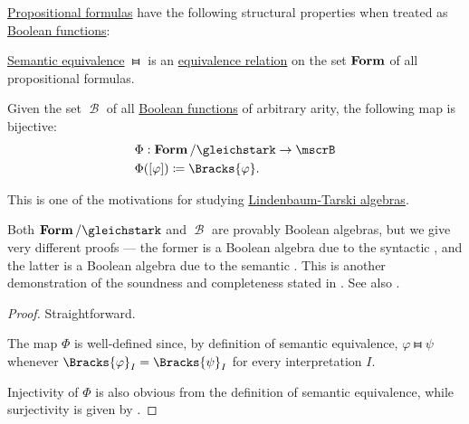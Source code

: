 \begin{proposition}\label{thm:propositional_formulas_and_boolean_functions}
  \hyperref[def:propositional_syntax/formula]{Propositional formulas} have the following structural properties when treated as \hyperref[def:boolean_function]{Boolean functions}:

  \begin{thmenum}
     \hyperref[def:propositional_entailment/equivalence]{Semantic equivalence} \( \gleichstark \) is an \hyperref[def:equivalence_relation]{equivalence relation} on the set \( \operatorname{\mathbf{Form}} \) of all propositional formulas.

     Given the set \( \mscrB \) of all \hyperref[def:boolean_function]{Boolean functions} of arbitrary arity, the following map is bijective:
    \begin{equation*}
      \begin{aligned}
        &\Phi: \boldop{Form} / {\gleichstark} \to \mscrB \\
        &\Phi([\varphi]) \coloneqq \Bracks{\varphi}.
      \end{aligned}
    \end{equation*}
  \end{thmenum}
\end{proposition}
\begin{comments}
  \item This is one of the motivations for studying \hyperref[def:lindenbaum_tarski_algebra]{Lindenbaum-Tarski algebras}.
  \item Both \( \boldop{Form} / {\gleichstark} \) and \( \mscrB \) are provably Boolean algebras, but we give very different proofs --- the former is a Boolean algebra due to the syntactic , and the latter is a Boolean algebra due to the semantic . This is another demonstration of the soundness and completeness stated in . See also .
\end{comments}
\begin{proof}
   Straightforward.

   The map \( \Phi \) is well-defined since, by definition of semantic equivalence, \( \varphi \gleichstark \psi \) whenever \( \Bracks{\varphi}_I = \Bracks{\psi}_I \) for every interpretation \( I \).

  Injectivity of \( \Phi \) is also obvious from the definition of semantic equivalence, while surjectivity is given by .
\end{proof}
